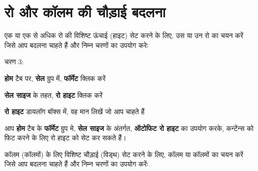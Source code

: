 \section{रो और कॉलम की चौड़ाई बदलना}\label{id-2.5}


\vskip -10pt

एक या एक से अधिक रो की विशिष्ट ऊंचाई (हाइट) सेट करने के लिए, उस या उन रो का चयन करें जिसे आप बदलना चाहते हैं और निम्न चरणों का उपयोग करेः
\begin{descriptionSimple}{चरण 3:}
\item[चरण 1] \textbf{होम} टैब पर, \textbf{सेल} ग्रुप में, \textbf{फॉर्मेट} क्लिक करें
\item[चरण 2] \textbf{सेल साइज} के तहत, \textbf{रो हाइट} क्लिक करें
\item[चरण 3] \textbf{रो हाइट} डायलॉग बॉक्स में, वह मान लिखें जो आप चाहते हैं
\end{descriptionSimple}
आप \textbf{होम} टैब के \textbf{फॉर्मेट} ग्रुप मे, \textbf{सेल साइज} के अंतर्गत, \textbf{ऑटोफिट रो हाइट} का उपयोग करके, कन्टेंन्स को फिट करने के लिए रो हाइट को सेट कर सकते हैं।

\vskip -10pt

कॉलम (कॉलमों) के लिए विशिष्ट चौड़ाई (विड्थ) सेट करने के लिए, कॉलम या कॉलमों का चयन करें जिसे आप बदलना चाहते हैं और निम्न चरणों का उपयोग करेंः

\newpage

